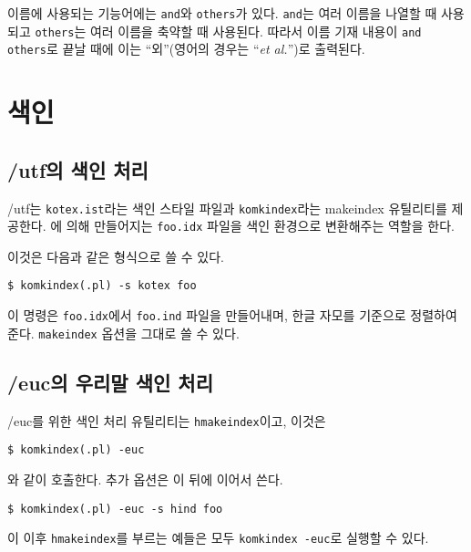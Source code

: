 이름에 사용되는 기능어에는 \texttt{and}와 \texttt{others}가 있다.
\texttt{and}는 여러 이름을 나열할 때 사용되고 \texttt{others}는 여러
이름을 축약할 때 사용된다.  따라서 이름 기재 내용이 \texttt{and
  others}로 끝날 때에 이는 ``\textvisiblespace 외''(영어의 경우는
``\textit{et al.}'')로 출력된다.

\section{색인}\label{sec:komkindex}

\subsection{\kotex/utf의 색인 처리}

\kotex/utf는 \texttt{kotex.ist}라는 색인 스타일 파일과
\texttt{komkindex}라는 makeindex 유틸리티를 제공한다. 
에 의해 만들어지는 \texttt{foo.idx} 파일을
색인 환경으로 변환해주는 역할을 한다.

이것은 다음과 같은 형식으로 쓸 수 있다.
\begin{verbatim}
$ komkindex(.pl) -s kotex foo
\end{verbatim}
이 명령은 \texttt{foo.idx}에서 \texttt{foo.ind} 파일을
만들어내며, 한글 자모를 기준으로 정렬하여 준다.
\texttt{makeindex} 옵션을 그대로 쓸 수 있다.

\subsection{\kotex/euc의 우리말 색인 처리}
\label{sec:index}

\kotex/euc를 위한 색인 처리 유틸리티는 \texttt{hmakeindex}이고,
이것은
\begin{verbatim}
$ komkindex(.pl) -euc
\end{verbatim}
와 같이 호출한다. 추가 옵션은 이 뒤에 이어서 쓴다.
\begin{verbatim}
$ komkindex(.pl) -euc -s hind foo
\end{verbatim}
이 이후 \texttt{hmakeindex}를 부르는 예들은 모두 \texttt{komkindex -euc}로
실행할 수 있다.

